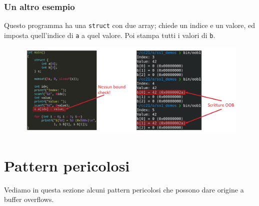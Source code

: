 \subsubsection{Un altro esempio}

Questo programma ha una \texttt{struct} con due array; chiede un indice e un valore, ed 
imposta quell'indice di \texttt{a} a quel valore. Poi stampa tutti i valori di \texttt{b}.

\begin{figure}[ht]
    \centering
    \includegraphics[width=1\linewidth]{images/out-bounds2.png}
\end{figure}

\section{Pattern pericolosi}

Vediamo in questa sezione alcuni pattern pericolosi che possono dare
origine a buffer overflows.

